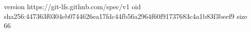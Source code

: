 version https://git-lfs.github.com/spec/v1
oid sha256:447363f0304eb0744626ea17fdc44fb56a2964f60f91737683c4a1b83f3beef9
size 66
